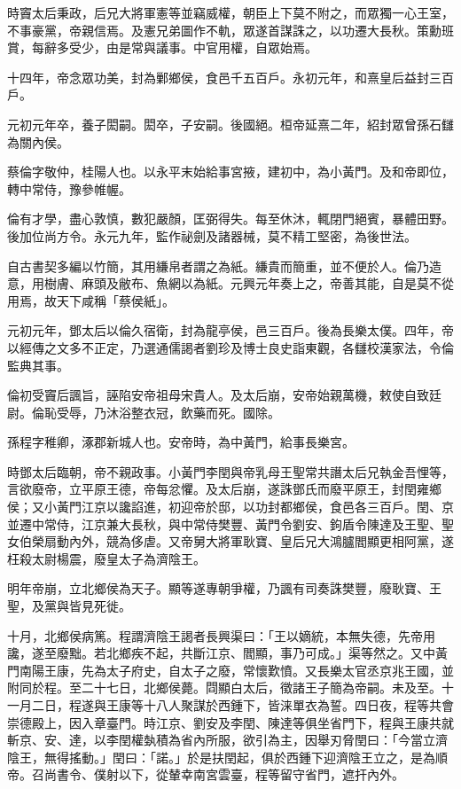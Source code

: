 \begin{pinyinscope}
時竇太后秉政，后兄大將軍憲等並竊威權，朝臣上下莫不附之，而眾獨一心王室，不事豪黨，帝親信焉。及憲兄弟圖作不軌，眾遂首謀誅之，以功遷大長秋。策勳班賞，每辭多受少，由是常與議事。中官用權，自眾始焉。

十四年，帝念眾功美，封為鄛鄉侯，食邑千五百戶。永初元年，和熹皇后益封三百戶。

元初元年卒，養子閎嗣。閎卒，子安嗣。後國絕。桓帝延熹二年，紹封眾曾孫石讎為關內侯。

蔡倫字敬仲，桂陽人也。以永平末始給事宮掖，建初中，為小黃門。及和帝即位，轉中常侍，豫參帷幄。

倫有才學，盡心敦慎，數犯嚴顏，匡弼得失。每至休沐，輒閉門絕賓，暴體田野。後加位尚方令。永元九年，監作祕劍及諸器械，莫不精工堅密，為後世法。

自古書契多編以竹簡，其用縑帛者謂之為紙。縑貴而簡重，並不便於人。倫乃造意，用樹膚、麻頭及敝布、魚網以為紙。元興元年奏上之，帝善其能，自是莫不從用焉，故天下咸稱「蔡侯紙」。

元初元年，鄧太后以倫久宿衛，封為龍亭侯，邑三百戶。後為長樂太僕。四年，帝以經傳之文多不正定，乃選通儒謁者劉珍及博士良史詣東觀，各讎校漢家法，令倫監典其事。

倫初受竇后諷旨，誣陷安帝祖母宋貴人。及太后崩，安帝始親萬機，敕使自致廷尉。倫恥受辱，乃沐浴整衣冠，飲藥而死。國除。

孫程字稚卿，涿郡新城人也。安帝時，為中黃門，給事長樂宮。

時鄧太后臨朝，帝不親政事。小黃門李閏與帝乳母王聖常共譖太后兄執金吾悝等，言欲廢帝，立平原王德，帝每忿懼。及太后崩，遂誅鄧氏而廢平原王，封閏雍鄉侯；又小黃門江京以讒諂進，初迎帝於邸，以功封都鄉侯，食邑各三百戶。閏、京並遷中常侍，江京兼大長秋，與中常侍樊豐、黃門令劉安、鉤盾令陳達及王聖、聖女伯榮扇動內外，競為侈虐。又帝舅大將軍耿寶、皇后兄大鴻臚閻顯更相阿黨，遂枉殺太尉楊震，廢皇太子為濟陰王。

明年帝崩，立北鄉侯為天子。顯等遂專朝爭權，乃諷有司奏誅樊豐，廢耿寶、王聖，及黨與皆見死徙。

十月，北鄉侯病篤。程謂濟陰王謁者長興渠曰：「王以嫡統，本無失德，先帝用讒，遂至廢黜。若北鄉疾不起，共斷江京、閻顯，事乃可成。」渠等然之。又中黃門南陽王康，先為太子府史，自太子之廢，常懷歎憤。又長樂太官丞京兆王國，並附同於程。至二十七日，北鄉侯薨。閰顯白太后，徵諸王子簡為帝嗣。未及至。十一月二日，程遂與王康等十八人聚謀於西鍾下，皆涞單衣為誓。四日夜，程等共會崇德殿上，因入章臺門。時江京、劉安及李閏、陳達等俱坐省門下，程與王康共就斬京、安、達，以李閏權埶積為省內所服，欲引為主，因舉刃脅閏曰：「今當立濟陰王，無得搖動。」閏曰：「諾。」於是扶閏起，俱於西鍾下迎濟陰王立之，是為順帝。召尚書令、僕射以下，從輦幸南宮雲臺，程等留守省門，遮扞內外。


\end{pinyinscope}
